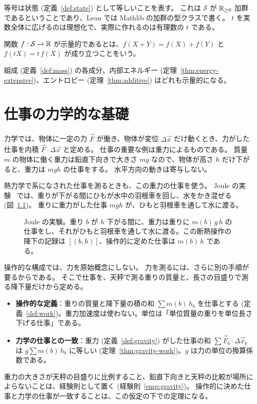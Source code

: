 等号は状態 (定義~\ref{def:state}) として等しいことを表す。
これは $\mathcal{S}$ が $\mathbb{R}_{\ge 0}$ 加群であるということであり、Lean では Mathlib の加群の型クラスで書く。
$t$ を実数全体に広げるのは理想化で、実際に作れるのは有理数の $t$ である。

\begin{definition}[示量的な関数]
  \label{def:extensive-fn}
  \leanok
  関数 $f : \mathcal{S} \to \mathbb{R}$ が示量的であるとは、$f(X + Y) = f(X) + f(Y)$ と $f(tX) = t\, f(X)$ が成り立つことをいう。
\end{definition}

組成 (定義~\ref{def:mass}) の各成分、内部エネルギー (定理~\ref{thm:energy-extensive})、エントロピー (定理~\ref{thm:additive}) はどれも示量的になる。

\chapter{仕事の力学的な基礎}

力学では、物体に一定の力 $\vec F$ が働き、物体が変位 $\Delta \vec x$ だけ動くとき、力がした仕事を内積 $\vec F \cdot \Delta \vec x$ と定める。
仕事の重要な例は重力によるものである。
質量 $m$ の物体に働く重力は鉛直下向きで大きさ $m g$ なので、物体が高さ $h$ だけ下がると、重力は $m g h$ の仕事をする。
水平方向の動きは寄与しない。

熱力学で系になされた仕事を測るときも、この重力の仕事を使う。
Joule の実験~\cite{Joule1850} では、重りが下がる間にひもが水中の羽根車を回し、水をかき混ぜる (図~\ref{fig:joule})。
重りに重力がした仕事 $m g h$ が、ひもと羽根車を通して水に渡る。

\begin{figure}[htbp]
  \centering
  \caption{Joule の実験。重り $b$ が $h$ 下がる間に、重力は重りに $m(b)\, g\, h$ の仕事をし、それがひもと羽根車を通して水に渡る。この断熱操作の降下の記録は $[(b, h)]$、操作的に定めた仕事は $m(b)\, h$ である。}
  \label{fig:joule}
\end{figure}

操作的な構成では、力を原始概念にしない。
力を測るには、さらに別の手順が要るからである。
そこで仕事を、天秤で測る重りの質量と、長さの目盛りで測る降下量だけから定める。
\begin{itemize}
  \item \textbf{操作的な定義}：重りの質量と降下量の積の和 $\sum m(b)\, h_b$ を仕事とする (定義~\ref{def:work})。重力加速度は使わない。単位は「単位質量の重りを単位長さ下げる仕事」である。
  \item \textbf{力学の仕事との一致}：重力 (定義~\ref{def:gravity}) がした仕事の和 $\sum \vec F_b \cdot \Delta \vec x_b$ は $g \sum m(b)\, h_b$ に等しい (定理~\ref{thm:gravity-work})。$g$ は力の単位の換算係数である。
\end{itemize}
重力の大きさが天秤の目盛りに比例すること、鉛直下向きと天秤の比較が場所によらないことは、経験則として置く (経験則~\ref{emp:gravity})。
操作的に決めた仕事と力学の仕事が一致することは、この仮定の下での定理になる。

